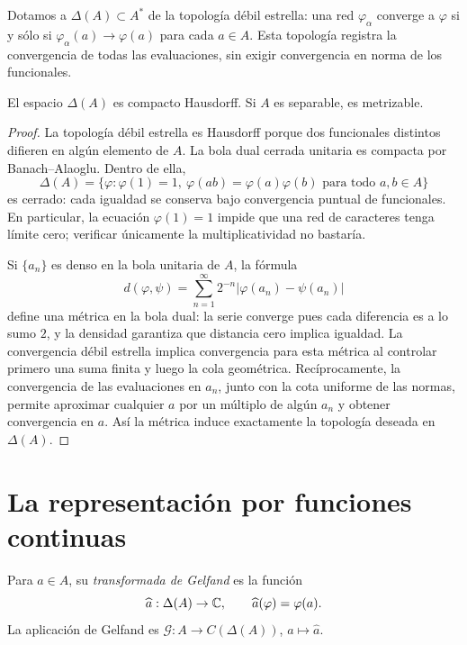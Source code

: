 Dotamos a $\Delta(A)\subset A^*$ de la topología débil estrella: una red $\varphi_\alpha$ converge a $\varphi$ si y sólo si $\varphi_\alpha(a)\to\varphi(a)$ para cada $a\in A$. Esta topología registra la convergencia de todas las evaluaciones, sin exigir convergencia en norma de los funcionales.

\begin{teorema}\label{v3:compacto-caracteres}
El espacio $\Delta(A)$ es compacto Hausdorff. Si $A$ es separable, es metrizable.
\end{teorema}
\begin{proof}
La topología débil estrella es Hausdorff porque dos funcionales distintos difieren en algún elemento de $A$. La bola dual cerrada unitaria es compacta por Banach--Alaoglu. Dentro de ella,
\[
 \Delta(A)=\{\varphi:\varphi(1)=1,\ \varphi(ab)=\varphi(a)\varphi(b)\text{ para todo }a,b\in A\}
\]
es cerrado: cada igualdad se conserva bajo convergencia puntual de funcionales. En particular, la ecuación $\varphi(1)=1$ impide que una red de caracteres tenga límite cero; verificar únicamente la multiplicatividad no bastaría.

Si $\{a_n\}$ es denso en la bola unitaria de $A$, la fórmula
\[
 d(\varphi,\psi)=\sum_{n=1}^{\infty}2^{-n}|\varphi(a_n)-\psi(a_n)|
\]
define una métrica en la bola dual: la serie converge pues cada diferencia es a lo sumo $2$, y la densidad garantiza que distancia cero implica igualdad. La convergencia débil estrella implica convergencia para esta métrica al controlar primero una suma finita y luego la cola geométrica. Recíprocamente, la convergencia de las evaluaciones en $a_n$, junto con la cota uniforme de las normas, permite aproximar cualquier $a$ por un múltiplo de algún $a_n$ y obtener convergencia en $a$. Así la métrica induce exactamente la topología deseada en $\Delta(A)$.
\end{proof}

\section{La representación por funciones continuas}

\begin{definicion}
Para $a\in A$, su \emph{transformada de Gelfand} es la función
\[
 \widehat a:\Delta(A)\to\mathbb C,\qquad \widehat a(\varphi)=\varphi(a).
\]
La aplicación de Gelfand es $\mathcal G:A\to C(\Delta(A))$, $a\mapsto\widehat a$.
\end{definicion}

